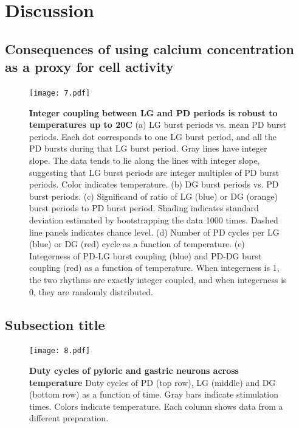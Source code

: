 \documentclass[9pt,lineno]{elife}
\begin{document}
\section{Discussion}




\subsection{Consequences of using calcium concentration as a proxy for cell activity}

\lipsum[5]

\begin{figure}[!htp]
\centering
\begin{fullwidth}
\texttt{[image: 7.pdf]}
\end{fullwidth}
\caption{\textbf{Integer coupling between LG and PD periods is robust to temperatures up to 20\degree C} (a) LG burst periods vs. mean PD burst periods. Each dot corresponds to one LG burst period, and all the PD bursts during that LG burst period. Gray lines have integer slope. The data tends to lie along the lines with integer slope, suggesting that LG burst periods are integer multiples of PD burst periods. Color indicates temperature. (b) DG burst periods vs. PD burst periods. (c) Significand of ratio of LG (blue) or DG (orange) burst periods to PD burst period. Shading indicates standard deviation estimated by bootstrapping the data 1000 times.  Dashed line panels indicates chance level. (d) Number of PD cycles per LG (blue) or DG (red) cycle as a function of temperature. (e) Integerness of PD-LG burst coupling (blue) and PD-DG burst coupling (red) as a function of temperature. When integerness is 1, the two rhythms are exactly integer coupled, and when integerness is 0, they are randomly distributed.   }
\end{figure}


\lipsum[1]

\subsection{Subsection title}

\lipsum[2]


\begin{figure}
\begin{fullwidth}
\texttt{[image: 8.pdf]}

\caption{\textbf{Duty cycles of pyloric and gastric neurons across temperature } Duty cycles of PD (top row), LG (middle) and DG (bottom row) as a function of time. Gray bars indicate stimulation times. Colors indicate temperature. Each column shows data from a different preparation.    } 
\label{fig:8}
\end{fullwidth}
\end{figure}
\end{document}
